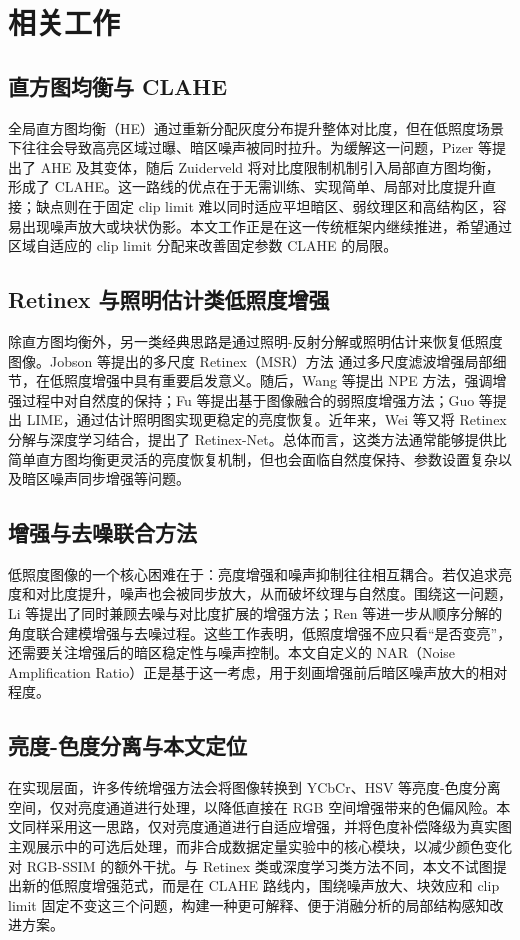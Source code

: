 \section{相关工作}

\subsection{直方图均衡与 CLAHE}
全局直方图均衡（HE）通过重新分配灰度分布提升整体对比度，但在低照度场景下往往会导致高亮区域过曝、暗区噪声被同时拉升。为缓解这一问题，Pizer 等提出了 AHE 及其变体\cite{pizer1987ahe}，随后 Zuiderveld 将对比度限制机制引入局部直方图均衡，形成了 CLAHE\cite{zuiderveld1994clahe}。这一路线的优点在于无需训练、实现简单、局部对比度提升直接；缺点则在于固定 clip limit 难以同时适应平坦暗区、弱纹理区和高结构区，容易出现噪声放大或块状伪影。本文工作正是在这一传统框架内继续推进，希望通过区域自适应的 clip limit 分配来改善固定参数 CLAHE 的局限。

\subsection{Retinex 与照明估计类低照度增强}
除直方图均衡外，另一类经典思路是通过照明-反射分解或照明估计来恢复低照度图像。Jobson 等提出的多尺度 Retinex（MSR）方法\cite{jobson1997retinex} 通过多尺度滤波增强局部细节，在低照度增强中具有重要启发意义。随后，Wang 等提出 NPE 方法\cite{wang2013loe}，强调增强过程中对自然度的保持；Fu 等提出基于图像融合的弱照度增强方法\cite{fu2016fusion}；Guo 等提出 LIME\cite{guo2017lime}，通过估计照明图实现更稳定的亮度恢复。近年来，Wei 等又将 Retinex 分解与深度学习结合，提出了 Retinex-Net\cite{wei2018retinexnet}。总体而言，这类方法通常能够提供比简单直方图均衡更灵活的亮度恢复机制，但也会面临自然度保持、参数设置复杂以及暗区噪声同步增强等问题。

\subsection{增强与去噪联合方法}
低照度图像的一个核心困难在于：亮度增强和噪声抑制往往相互耦合。若仅追求亮度和对比度提升，噪声也会被同步放大，从而破坏纹理与自然度。围绕这一问题，Li 等提出了同时兼顾去噪与对比度扩展的增强方法\cite{li2015lowlight}；Ren 等进一步从顺序分解的角度联合建模增强与去噪过程\cite{ren2018joint}。这些工作表明，低照度增强不应只看“是否变亮”，还需要关注增强后的暗区稳定性与噪声控制。本文自定义的 NAR（Noise Amplification Ratio）正是基于这一考虑，用于刻画增强前后暗区噪声放大的相对程度。

\subsection{亮度-色度分离与本文定位}
在实现层面，许多传统增强方法会将图像转换到 YCbCr、HSV 等亮度-色度分离空间，仅对亮度通道进行处理，以降低直接在 RGB 空间增强带来的色偏风险。本文同样采用这一思路，仅对亮度通道进行自适应增强，并将色度补偿降级为真实图主观展示中的可选后处理，而非合成数据定量实验中的核心模块，以减少颜色变化对 RGB-SSIM 的额外干扰。与 Retinex 类或深度学习类方法不同，本文不试图提出新的低照度增强范式，而是在 CLAHE 路线内，围绕噪声放大、块效应和 clip limit 固定不变这三个问题，构建一种更可解释、便于消融分析的局部结构感知改进方案。
